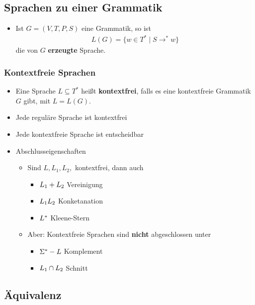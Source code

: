 \documentclass{scrartcl}
\begin{document}
\subsection{Sprachen zu einer Grammatik}

\begin{itemize}
	\item Ist $G = (V,T,P,S)$ eine Grammatik, so ist
	\begin{align*}
		L(G) = \{ w \in T^* \mid S \rightarrow^* w \}
	\end{align*}
	die von $G$ \textbf{erzeugte} Sprache.
\end{itemize}

\subsubsection{Kontextfreie Sprachen}

\begin{itemize}
	\item Eine Sprache $L \subseteq T^*$ heißt \textbf{kontextfrei}, falls es eine kontextfreie Grammatik $G$ gibt, mit $L = L(G)$.
	\item Jede reguläre Sprache ist kontextfrei
	\item Jede kontextfreie Sprache ist entscheidbar
	\item Abschlusseigenschaften
	\begin{itemize}
		\item Sind $L,L_1,L_2,$ kontextfrei, dann auch
		\begin{itemize}
			\item $L_1 + L_2 \hfill$ Vereinigung
			\item $L_1 L_2 \hfill$ Konketanation
			\item $L^* \hfill$ Kleene-Stern
		\end{itemize}
		\item Aber: Kontextfreie Sprachen sind \textbf{nicht} abgeschlossen unter
		\begin{itemize}
			\item $\Sigma^* - L \hfill$ Komplement
			\item $L_1 \cap L_2 \hfill$ Schnitt
		\end{itemize}
	\end{itemize}
\end{itemize}

\subsection{Äquivalenz}
\end{document}
